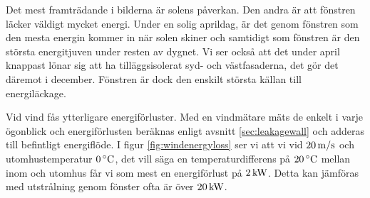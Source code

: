 Det mest framträdande i bilderna är solens påverkan. Den andra är att fönstren läcker väldigt 
mycket energi. Under en solig aprildag, är det genom fönstren som den mesta energin 
kommer in när solen skiner och samtidigt som fönstren är den största energitjuven under 
resten av dygnet. Vi ser också att det under april knappast lönar sig att ha tilläggsisolerat syd-
 och västfasaderna, det gör det däremot i december. Fönstren är dock den enskilt största 
 källan till energiläckage.

Vid vind fås ytterligare energiförluster. Med en vindmätare mäts de enkelt i varje ögonblick och 
energiförlusten beräknas enligt avsnitt \ref{sec:leakagewall} och adderas till befintligt energiflöde. I figur \ref{fig:windenergyloss} ser vi att vi vid $\unit[20]{m/s}$ och utomhustemperatur $\unit[0]{^\circ C}$, det vill säga en temperaturdifferens på $\unit[20]{^\circ C}$ mellan inom och utomhus får vi som mest en energiförlust på $\unit[2]{kW}$. Detta kan jämföras med utstrålning genom fönster ofta är över $\unit[20]{kW}$.